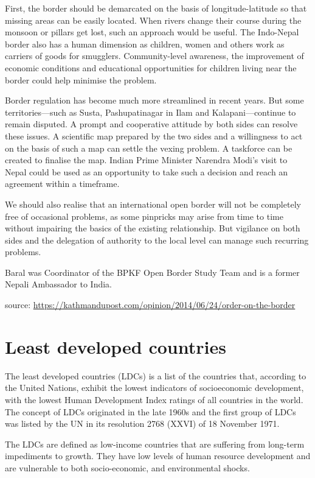 \documentclass[
  openany]{book}
\begin{document}
First, the border should be demarcated on the basis of longitude-latitude so that missing areas can be easily located. When rivers change their course during the monsoon or pillars get lost, such an approach would be useful. The Indo-Nepal border also has a human dimension as children, women and others work as carriers of goods for smugglers. Community-level awareness, the improvement of economic conditions and educational opportunities for children living near the border could help minimise the problem.

Border regulation has become much more streamlined in recent years. But some territories---such as Susta, Pashupatinagar in Ilam and Kalapani---continue to remain disputed. A prompt and cooperative attitude by both sides can resolve these issues. A scientific map prepared by the two sides and a willingness to act on the basis of such a map can settle the vexing problem. A taskforce can be created to finalise the map. Indian Prime Minister Narendra Modi's visit to Nepal could be used as an opportunity to take such a decision and reach an agreement within a timeframe.

We should also realise that an international open border will not be completely free of occasional problems, as some pinpricks may arise from time to time without impairing the basics of the existing relationship. But vigilance on both sides and the delegation of authority to the local level can manage such recurring problems.

Baral was Coordinator of the BPKF Open Border Study Team and is a former Nepali Ambassador to India.

source: \url{https://kathmandupost.com/opinion/2014/06/24/order-on-the-border}

\hypertarget{least-developed-countries}{%
\section{Least developed countries}\label{least-developed-countries}}

The least developed countries (LDCs) is a list of the countries that, according to the United Nations, exhibit the lowest indicators of socioeconomic development, with the lowest Human Development Index ratings of all countries in the world. The concept of LDCs originated in the late 1960s and the first group of LDCs was listed by the UN in its resolution 2768 (XXVI) of 18 November 1971.

The LDCs are defined as low-income countries that are suffering from long-term impediments to growth. They have low levels of human resource development and are vulnerable to both socio-economic, and environmental shocks.
\end{document}
